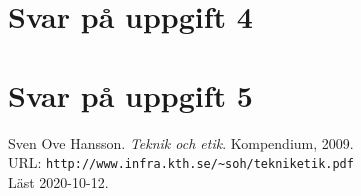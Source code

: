\documentclass[a4paper,12pt]{article}
\begin{document}



\section*{Svar på uppgift 4}




\section*{Svar på uppgift 5}




\begin{thebibliography}{99}
   Sven Ove Hansson. \emph{Teknik och etik}.
    Kompendium, 2009. \\
    URL: \verb|http://www.infra.kth.se/~soh/tekniketik.pdf| \\
    Läst 2020-10-12. 
  \end{thebibliography}
\end{document}
